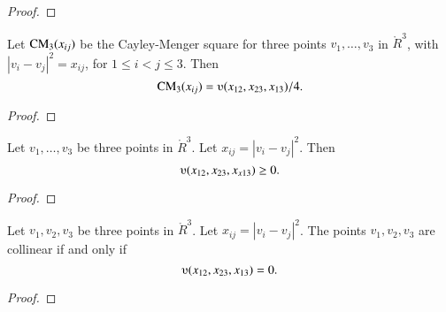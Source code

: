 \begin{tarskidata}
\begin{tarski}
\begin{proof}
\end{proof}
\end{tarski}



\begin{tarski}

\begin{lemma}
	Let ${\operatorname{CM}}_3(x_{ij})$ be the Cayley-Menger square for
three points $v_1,\ldots,v_3$ in $\ring{R}^3$, with $|v_i-v_j|^2 = x_{ij}$,
for $1\le i < j \le 3$.  Then
	$$\op{CM}_3(x_{ij}) = \ups(x_{12},x_{23},x_{13})/4.$$
\end{lemma}

\begin{proof}
\end{proof}
\end{tarski}



\begin{tarski}

\begin{lemma}
Let $v_1,\ldots,v_3$ be three points
in $\ring{R}^3$.  Let $x_{ij} = |v_i-v_j|^2$.  Then
	$$\ups(x_{12},x_{23},x_{x13})\ge0.$$
\end{lemma}

\begin{proof}
\end{proof}
\end{tarski}



\begin{tarski}

\begin{lemma}
Let $v_1,v_2,v_3$ be three points
in $\ring{R}^3$.  Let $x_{ij} = |v_i-v_j|^2$.
The points $v_1,v_2,v_3$ are collinear if and only if
	$$\ups(x_{12},x_{23},x_{13}) = 0.$$
\end{lemma}

\begin{proof}
\end{proof}
\end{tarski}




\end{tarskidata}
